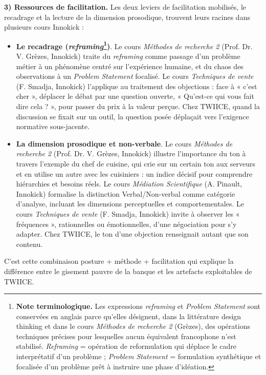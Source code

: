\textbf{3) Ressources de facilitation.}
Les deux leviers de facilitation mobilisés, le recadrage et la lecture de la dimension prosodique, trouvent leurs racines dans plusieurs cours Innokick :

\begin{itemize}
  \item \textbf{Le recadrage (\emph{reframing}\footnote{\textbf{Note terminologique.} Les expressions \emph{reframing} et \emph{Problem Statement} sont conservées en anglais parce qu'elles désignent, dans la littérature design thinking et dans le cours \textit{Méthodes de recherche 2} (Grèzes), des opérations techniques précises pour lesquelles aucun équivalent francophone n'est stabilisé. \emph{Reframing} = opération de reformulation qui déplace le cadre interprétatif d'un problème ; \emph{Problem Statement} = formulation synthétique et focalisée d'un problème prêt à instruire une phase d'idéation.\label{fn:reframing-problemstatement}})}. Le cours \textit{Méthodes de recherche 2} (Prof. Dr. V. Grèzes, Innokick) traite du \emph{reframing} comme passage d'un problème métier à un phénomène centré sur l'expérience humaine, et du chaos des observations à un \emph{Problem Statement} focalisé. Le cours \textit{Techniques de vente} (F. Smadja, Innokick) l'applique au traitement des objections : face à « c'est cher », déplacer le débat par une question ouverte, « Qu'est-ce qui vous fait dire cela ? », pour passer du prix à la valeur perçue. Chez TWIICE, quand la discussion se fixait sur un outil, la question posée déplaçait vers l'exigence normative sous-jacente.
  \item \textbf{La dimension prosodique et non-verbale}. Le cours \textit{Méthodes de recherche 2} (Prof. Dr. V. Grèzes, Innokick) illustre l'importance du ton à travers l'exemple du chef de cuisine, qui crie sur un certain ton aux serveurs et en utilise un autre avec les cuisiniers : un indice décisif pour comprendre hiérarchies et besoins réels. Le cours \textit{Médiation Scientifique} (A. Pinault, Innokick) formalise la distinction Verbal/Non-verbal comme catégorie d'analyse, incluant les dimensions perceptuelles et comportementales. Le cours \textit{Techniques de vente} (F. Smadja, Innokick) invite à observer les « fréquences », rationnelles ou émotionnelles, d'une négociation pour s'y adapter. Chez TWIICE, le ton d'une objection renseignait autant que son contenu.
\end{itemize}

C'est cette combinaison posture + méthode + facilitation qui explique la différence entre le gisement pauvre de la banque et les artefacts exploitables de TWIICE.

